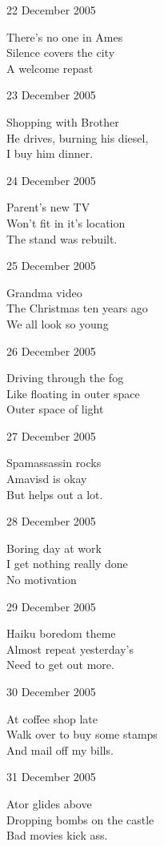 \documentclass[12pt]{article}
\begin{document}
22 December 2005

There's no one in Ames \\
Silence covers the city \\
A welcome repast 

23 December 2005

Shopping with Brother \\
He drives, burning his diesel, \\
I buy him dinner.

24 December 2005

Parent's new TV \\
Won't fit in it's location \\
The stand was rebuilt.

25 December 2005

Grandma video \\
The Christmas ten years ago \\
We all look so young   


\newpage

26 December 2005

Driving through the fog \\
Like floating in outer space \\
Outer space of light

27 December 2005

Spamassassin rocks \\
Amavisd is okay \\
But helps out a lot.

28 December 2005

Boring day at work \\
I get nothing really done \\
No motivation

29 December 2005

Haiku boredom theme \\
Almost repeat yesterday's \\
Need to get out more.

30 December 2005

At coffee shop late \\
Walk over to buy some stamps \\
And mail off my bills.

31 December 2005

Ator glides above \\
Dropping bombs on the castle \\
Bad movies kick ass.


\newpage
\end{document}
